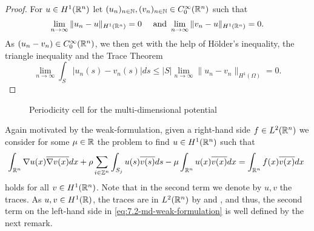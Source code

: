 \begin{proof}
	For $u \in H^{1}(\mathbb{R}^{n})$ let $(u_{n})_{n \in \mathbb{N}}, (v_{n})_{n \in \mathbb{N}} \in C_{0}^{\infty}(\mathbb{R}^{n})$ such that
	\[ \lim_{n \rightarrow \infty} \| u_{n} - u \|_{H^{1}(\mathbb{R}^{n})} = 0 \quad \text{ and } \lim_{n \rightarrow \infty} \| v_{n} - u\|_{H^{1}(\mathbb{R}^{n})} = 0.  \]
	As $(u_{n} - v_{n}) \in C_{0}^{\infty}(\mathbb{R}^{n})$, we then get with the help of Hölder's inequality, the triangle inequality and the Trace Theorem
	\[ \lim_{n \rightarrow \infty} \int_{S} \left| u_{n}(s) - v_{n}(s) \right| ds \leq |S| \lim_{n \rightarrow \infty} \| u_{n} - v_{n} \|_{H^{1}(\Omega)} = 0. \] 
\end{proof}

\begin{figure}[!ht] \centering
	\caption{Periodicity cell for the multi-dimensional potential} \label{fig:7.1}
\end{figure}

Again motivated by the weak-formulation, given a right-hand side $f \in L^{2}(\mathbb{R}^{n})$ we consider for some	 $\mu \in \mathbb{R}$ the problem to find $u \in H^{1}(\mathbb{R}^{n})$ such that
	\begin{equation}
		\int_{\R^{n}} \nabla u(x) \overline{\nabla v(x)} dx + \rho \sum_{i \in \Z^{n}} \int_{S_{j}} u(s) \overline{v(s)} ds - \mu \int_{\R^{n}} u(x) \overline{v(x)} dx = \int_{\R^{n}} f(x) \overline{v(x)} dx \label{eq:7.2-md-weak-formulation}
	\end{equation} 
holds for all $v \in H^{1}(\mathbb{R}^{n})$. Note that in the second term we denote by $u, v$ the traces. As $u, v \in H^{1}(\mathbb{R})$, the traces are in $L^{2}(\mathbb{R}^{n})$ by \cite[p. 251, Theorem 5.1]{evans1998partial} and \cite[p. 164]{adams2003sobolev}, and thus, the second term on the left-hand side in \eqref{eq:7.2-md-weak-formulation} is well defined by the next remark.


